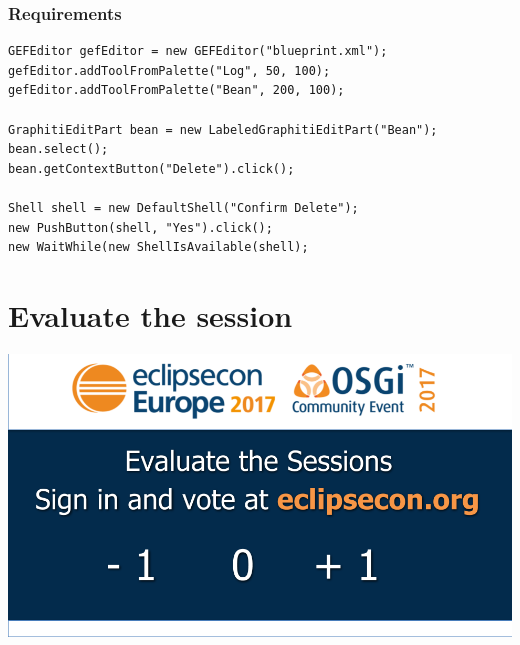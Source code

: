 \documentclass{beamer}
\begin{document}
\begin{frame}[fragile]
\frametitle{Requirements}
\begin{lstlisting}
GEFEditor gefEditor = new GEFEditor("blueprint.xml");
gefEditor.addToolFromPalette("Log", 50, 100);
gefEditor.addToolFromPalette("Bean", 200, 100);

GraphitiEditPart bean = new LabeledGraphitiEditPart("Bean");
bean.select();
bean.getContextButton("Delete").click();

Shell shell = new DefaultShell("Confirm Delete");
new PushButton(shell, "Yes").click();
new WaitWhile(new ShellIsAvailable(shell);
\end{lstlisting}
\end{frame}

\section{Evaluate the session}
\begin{frame}[fragile]
\begin{center}
\includegraphics[width=\textwidth,height=0.8\textheight,keepaspectratio]{SpeakerEvalSlide-16-9-2017.png}
\end{center}
\end{frame}
\end{document}
